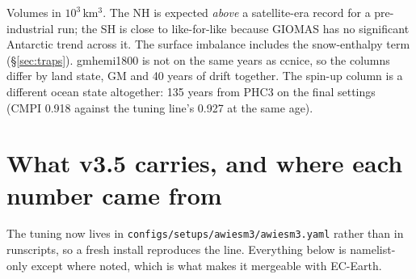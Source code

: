 \documentclass[10pt]{article}
\begin{document}
Volumes in $10^3$\,km$^3$. The NH is expected \emph{above} a satellite-era record for a
pre-industrial run; the SH is close to like-for-like because GIOMAS has no significant
Antarctic trend across it. The surface imbalance includes the snow-enthalpy term
(\S\ref{sec:traps}). gmhemi1800 is not on the same years as ccnice, so the columns differ by
land state, GM and 40 years of drift together. The spin-up column is a different ocean state
altogether: 135 years from PHC3 on the final settings (CMPI 0.918 against the tuning line's 0.927 at the
same age).

\section{What v3.5 carries, and where each number came from}\label{sec:config}

The tuning now lives in \texttt{configs/setups/awiesm3/awiesm3.yaml} rather than in
runscripts, so a fresh install reproduces the line. Everything below is namelist-only
except where noted, which is what makes it mergeable with EC-Earth.
\end{document}
